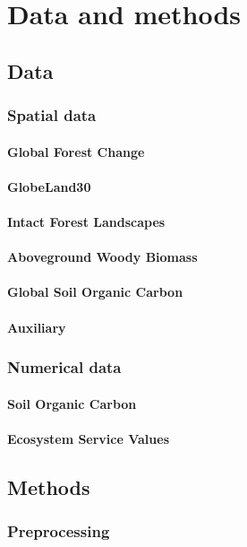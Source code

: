 \section{Data and methods}
\label{sec:datamethods}
\subsection{Data}
\label{subsec:data}
\subsubsection{Spatial data}
\paragraph{Global Forest Change}
\paragraph{GlobeLand30}
\paragraph{Intact Forest Landscapes}
\paragraph{Aboveground Woody Biomass}
\paragraph{Global Soil Organic Carbon}
\paragraph{Auxiliary}
\subsubsection{Numerical data}
\paragraph{Soil Organic Carbon}
\paragraph{Ecosystem Service Values}
\subsection{Methods}
\label{subsec:methods}
\subsubsection{Preprocessing}
